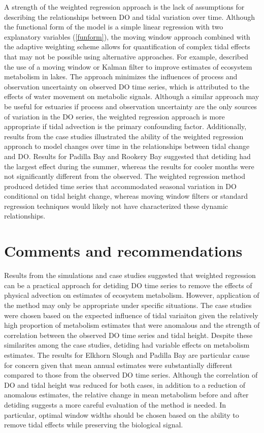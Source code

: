 \documentclass[letterpaper,12pt,oneside]{article}\usepackage[]{graphicx}\usepackage[]{color}
\begin{document}
A strength of the weighted regression approach is the lack of assumptions for describing the relationships between \ac{DO} and tidal variation over time.  Although the functional form of the model is a simple linear regression with two explanatory variables (\cref{funform}), the moving window approach combined with the adaptive weighting scheme allows for quantification of complex tidal effects that may not be possible using alternative approaches.  For example, \citet{Batt12} described the use of a moving window or Kalman filter to improve estimates of ecosystem metabolism in lakes.  The approach minimizes the influences of process and observation uncertainty on observed \ac{DO} time series, which is attributed to the effects of water movement on metabolic signals.  Although a similar approach may be useful for estuaries if process and observation uncertainty are the only sources of variation in the \ac{DO} series, the weighted regression approach is more appropriate if tidal advection is the primary confounding factor.  Additionally, results from the case studies illustrated the ability of the weighted regression approach to model changes over time in the relationships between tidal change and \ac{DO}.  Results for Padilla Bay and Rookery Bay suggested that detiding had the largest effect during the summer, whereas the results for cooler months were not significantly different from the observed.  The weighted regression method produced detided time series that accommodated seasonal variation in \ac{DO} conditional on tidal height change, whereas moving window filters or standard regression techniques would likely not have characterized these dynamic relationships.

\section{Comments and recommendations}

Results from the simulations and case studies suggested that weighted regression can be a practical approach for detiding \ac{DO} time series to remove the effects of physical advection on estimates of ecosystem metabolism.  However, application of the method may only be appropriate under specific situations.  The case studies were chosen based on the expected influence of tidal variaiton given the relatively high proportion of metabolism estimates that were anomalous and the strength of correlation between the observed \ac{DO} time series and tidal height.  Despite these similarites among the case studies, detiding had variable effects on metabolism estimates.  The results for Elkhorn Slough and Padilla Bay are particular cause for concern given that mean annual estimates were substantially different compared to those from the observed \ac{DO} time series.  Although the correlation of \ac{DO} and tidal height was reduced for both cases, in addition to a reduction of anomalous estimates, the relative change in mean metabolism before and after detiding suggests a more careful evaluation of the method is needed.  In particular, optimal window widths should be chosen based on the ability to remove tidal effects while preserving the biological signal.  
\end{document}
